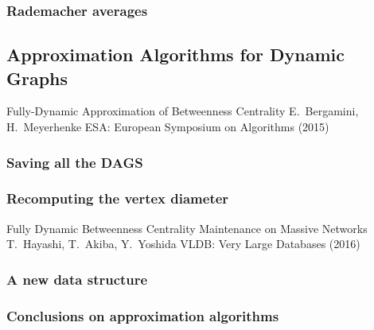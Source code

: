 \begin{frame}
  \frametitle{Rademacher averages}
\end{frame}

\subsection{Approximation Algorithms for Dynamic Graphs}

\begin{frame}
  \centering
  \vfill
  {\huge Fully-Dynamic Approximation of Betweenness Centrality}
  \vfill
  {\Large E.~Bergamini, H.~Meyerhenke}
  \vfill
  {\large ESA: European Symposium on Algorithms (2015)}
  \vfill
\end{frame}

\begin{frame}
  \frametitle{Saving all the DAGS}
\end{frame}

\begin{frame}
  \frametitle{Recomputing the vertex diameter}
\end{frame}

\begin{frame}
  \centering
  \vfill
  {\huge Fully Dynamic Betweenness Centrality Maintenance on Massive
  Networks}
  \vfill
  {\Large T.~Hayashi, T.~Akiba, Y.~Yoshida}
  \vfill
  {\large VLDB: Very Large Databases (2016)}
  \vfill
\end{frame}

\begin{frame}
  \frametitle{A new data structure}
\end{frame}

\begin{frame}
  \frametitle{Conclusions on approximation algorithms}
\end{frame}
